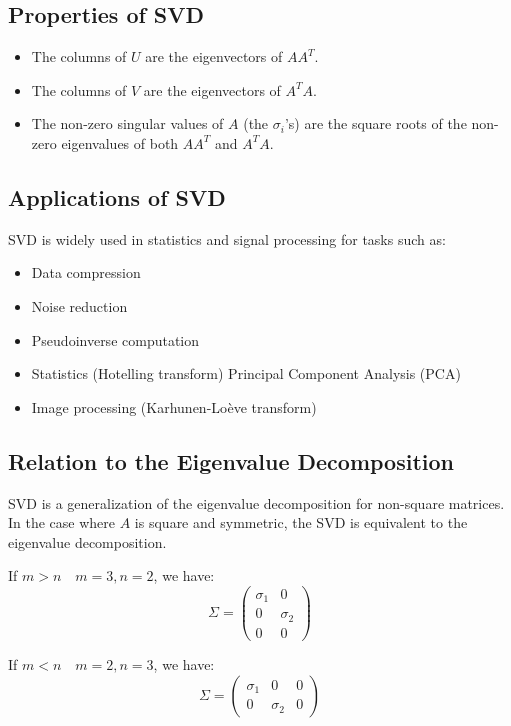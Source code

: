 \subsection{Properties of SVD}
\begin{itemize}
    \item The columns of $U$ are the eigenvectors of $AA^T$.
    \item The columns of $V$ are the eigenvectors of $A^TA$.
    \item The non-zero singular values of $A$ (the $\sigma_i$'s) are the square roots of the non-zero eigenvalues of both $AA^T$ and $A^TA$.
\end{itemize}

\subsection{Applications of SVD}
SVD is widely used in statistics and signal processing for tasks such as:
\begin{itemize}
    \item Data compression
    \item Noise reduction
    \item Pseudoinverse computation
    \item Statistics (Hotelling transform)
    \subitem Principal Component Analysis (PCA)
    \item Image processing (Karhunen-Loève transform)
\end{itemize}

\subsection{Relation to the Eigenvalue Decomposition}
SVD is a generalization of the eigenvalue decomposition for non-square matrices. In the case where $A$ is square and symmetric, the SVD is equivalent to the eigenvalue decomposition.

If $m > n \quad m=3, n=2$, we have:
\[
\Sigma = \begin{pmatrix}
\sigma_1 & 0 \\
0 & \sigma_2 \\
0 & 0
\end{pmatrix}
\]

If $m < n \quad m=2, n=3$, we have:
\[
\Sigma = \begin{pmatrix}
\sigma_1 & 0 & 0 \\
0 & \sigma_2 & 0
\end{pmatrix}
\]

